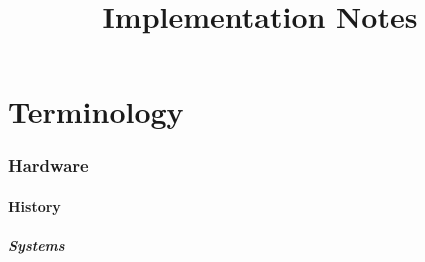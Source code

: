 \documentclass[notitlepage]{report}
\begin{document}
\title{Implementation Notes}
\maketitle

\part{Terminology}

\section{Hardware}

\subsection{History}


\subsubsection{Systems}
\end{document}

